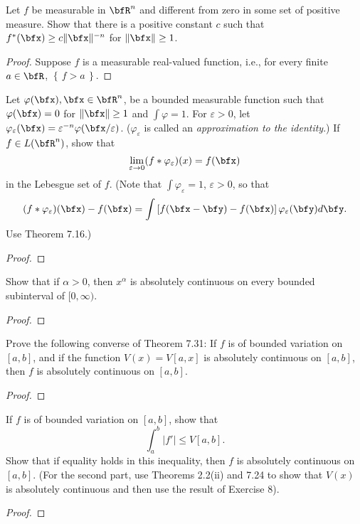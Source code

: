 
\begin{problem}
Let $f$ be measurable in $\bfR^n$ and different from zero in some set of
positive measure. Show that there is a positive constant $c$ such that
$f^*(\bfx)\geq c\|\bfx\|^{-n}$ for $\|\bfx\|\geq 1$.
\end{problem}
\begin{proof}
Suppose $f$ is a measurable real-valued function, i.e., for every finite
$a\in\bfR$, $\left\{\,f>a\,\right\}$.
\end{proof}
\newpage

\begin{problem}
Let $\varphi(\bfx),\bfx\in\bfR^n$, be a bounded measurable function such
that $\varphi(\bfx)=0$ for $\|\bfx\|\geq 1$ and $\int\varphi=1$. For
$\varepsilon>0$, let
$\varphi_\varepsilon(\bfx)=\varepsilon^{-n}\varphi(\bfx/\varepsilon)$. ($\varphi_\varepsilon$
is called an \emph{approximation to the identity}.) If $f\in L(\bfR^n)$,
show that
\[
\lim_{\varepsilon\to 0}(f*\varphi_\varepsilon)(x)=f(\bfx)
\]
in the Lebesgue set of $f$. (Note that $\int\varphi_\varepsilon=1$,
$\varepsilon>0$, so that
\[
(f*\varphi_\varepsilon)(\bfx)-f(\bfx)=\int\left[f(\bfx-\bfy)-f(\bfx)\right]\varphi_\varepsilon(\bfy)d\bfy.
\]
Use Theorem 7.16.)
\end{problem}
\begin{proof}
\end{proof}
\newpage

\begin{problem}
Show that if $\alpha>0$, then $x^\alpha$ is absolutely continuous on every
bounded subinterval of $[0,\infty)$.
\end{problem}
\begin{proof}
\end{proof}
\newpage


\begin{problem}
Prove the following converse of Theorem 7.31: If $f$ is of bounded
variation on $[a,b]$, and if the function $V(x)=V[a,x]$ is absolutely
continuous on $[a,b]$, then $f$ is absolutely continuous on $[a,b]$.
\end{problem}
\begin{proof}
\end{proof}
\newpage

\begin{problem}
If $f$ is of bounded variation on $[a,b]$, show that
\[
\int_a^b|f'|\leq V[a,b].
\]
Show that if equality holds in this inequality, then $f$ is absolutely
continuous on $[a,b]$. (For the second part, use Theorems 2.2(ii) and 7.24
to show that $V(x)$ is absolutely continuous and then use the result of
Exercise 8).
\end{problem}
\begin{proof}
\end{proof}
\newpage

